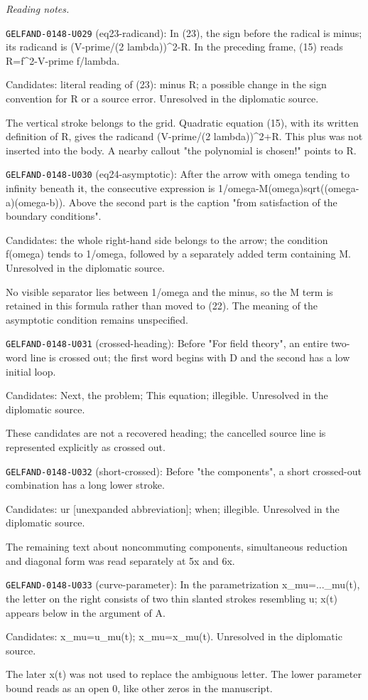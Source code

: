 \par\smallskip\noindent\textit{Reading notes.}\par
\noindent\texttt{GELFAND-0148-U029} (eq23-radicand): In (23), the sign before the radical is minus; its radicand is (V-prime/(2 lambda))\textasciicircum{}2-R. In the preceding frame, (15) reads R=f\textasciicircum{}2-V-prime f/lambda.\par
Candidates: literal reading of (23): minus R; a possible change in the sign convention for R or a source error. Unresolved in the diplomatic source.\par
The vertical stroke belongs to the grid. Quadratic equation (15), with its written definition of R, gives the radicand (V-prime/(2 lambda))\textasciicircum{}2+R. This plus was not inserted into the body. A nearby callout "the polynomial is chosen!" points to R.\par
\noindent\texttt{GELFAND-0148-U030} (eq24-asymptotic): After the arrow with omega tending to infinity beneath it, the consecutive expression is 1/omega-M(omega)sqrt((omega-a)(omega-b)). Above the second part is the caption "from satisfaction of the boundary conditions".\par
Candidates: the whole right-hand side belongs to the arrow; the condition f(omega) tends to 1/omega, followed by a separately added term containing M. Unresolved in the diplomatic source.\par
No visible separator lies between 1/omega and the minus, so the M term is retained in this formula rather than moved to (22). The meaning of the asymptotic condition remains unspecified.\par
\noindent\texttt{GELFAND-0148-U031} (crossed-heading): Before "For field theory", an entire two-word line is crossed out; the first word begins with D and the second has a low initial loop.\par
Candidates: Next, the problem; This equation; illegible. Unresolved in the diplomatic source.\par
These candidates are not a recovered heading; the cancelled source line is represented explicitly as crossed out.\par
\noindent\texttt{GELFAND-0148-U032} (short-crossed): Before "the components", a short crossed-out combination has a long lower stroke.\par
Candidates: ur [unexpanded abbreviation]; when; illegible. Unresolved in the diplomatic source.\par
The remaining text about noncommuting components, simultaneous reduction and diagonal form was read separately at 5x and 6x.\par
\noindent\texttt{GELFAND-0148-U033} (curve-parameter): In the parametrization x\_mu=...\_mu(t), the letter on the right consists of two thin slanted strokes resembling u; x(t) appears below in the argument of A.\par
Candidates: x\_mu=u\_mu(t); x\_mu=x\_mu(t). Unresolved in the diplomatic source.\par
The later x(t) was not used to replace the ambiguous letter. The lower parameter bound reads as an open 0, like other zeros in the manuscript.\par


